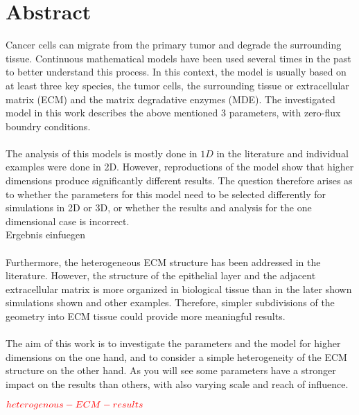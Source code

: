 \section*{Abstract}
Cancer cells can migrate from the primary tumor and degrade the surrounding tissue. Continuous mathematical models have been used several times in the past to better understand this process. In this context, the model is usually based on at least three key species, the tumor cells, the surrounding tissue or extracellular matrix (ECM) and the matrix degradative enzymes (MDE). The investigated model in this work describes the above mentioned 3 parameters, with zero-flux boundry conditions. \\ \\
The analysis of this models is mostly done in $1D$ in the literature and individual examples were done in 2D. However, reproductions of the model show that higher dimensions produce significantly different results. The question therefore arises as to whether the parameters for this model need to 
be selected differently for simulations in 2D or 3D, or whether the results and analysis for the one dimensional case is incorrect. \\
Ergebnis einfuegen\\ \\
Furthermore, the heterogeneous ECM structure has been addressed in the literature. However, the structure of the epithelial layer and the adjacent extracellular matrix is more organized in biological tissue than in the later shown simulations shown and other examples. Therefore, simpler subdivisions of the geometry into ECM tissue could provide more meaningful results. \\ \\
The aim of this work is to investigate the parameters and the model for higher dimensions on the one hand, and to consider a simple heterogeneity of the ECM structure on the other hand. As you will see some parameters have a stronger impact on the results than others, with also varying scale and reach of influence.

$\textcolor{red}{heterogenous-ECM-results}$